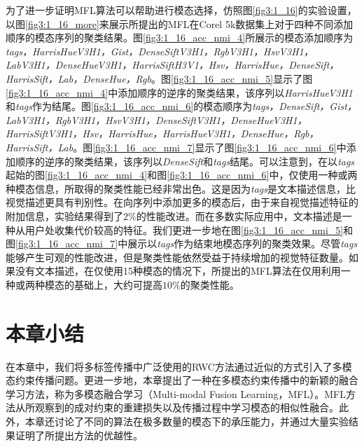 为了进一步证明MFL算法可以帮助进行模态选择，仿照图\ref{fig3:1_16}的实验设置，以图\ref{fig3:1_16_more}来展示所提出的MFL在Corel 5k数据集上对于四种不同添加顺序的模态序列的聚类结果。图\ref{fig3:1_16_acc_nmi_4}所展示的模态添加顺序为\textit{tags，HarrisHueV3H1，Gist，DenseSiftV3H1，RgbV3H1，HsvV3H1，LabV3H1，DenseHueV3H1，HarrisSiftH3V1，Hsv，HarrisHue，DenseSift，HarrisSift，Lab，DenseHue，Rgb}。图\ref{fig3:1_16_acc_nmi_5}显示了图\ref{fig3:1_16_acc_nmi_4}中添加顺序的逆序的聚类结果，该序列以\textit{HarrisHueV3H1}和\textit{tags}作为结尾。图\ref{fig3:1_16_acc_nmi_6}的模态顺序为\textit{tags，DenseSift，Gist，LabV3H1，RgbV3H1，HsvV3H1，DenseSiftV3H1，DenseHueV3H1，HarrisSiftV3H1，Hsv，HarrisHue，HarrisHueV3H1，DenseHue，Rgb，HarrisSift，Lab}。图\ref{fig3:1_16_acc_nmi_7}显示了图\ref{fig3:1_16_acc_nmi_6}中添加顺序的逆序的聚类结果，该序列以\textit{DenseSift}和\textit{tags}结尾。可以注意到，在以\textit{tags}起始的图\ref{fig3:1_16_acc_nmi_4}和图\ref{fig3:1_16_acc_nmi_6}中，仅使用一种或两种模态信息，所取得的聚类性能已经非常出色。这是因为\textit{tags}是文本描述信息，比视觉描述更具有判别性。在向序列中添加更多的模态后，由于来自视觉描述特征的附加信息，实验结果得到了$2\%$的性能改进。而在多数实际应用中，文本描述是一种从用户处收集代价较高的特征。我们更进一步地在图\ref{fig3:1_16_acc_nmi_5}和图\ref{fig3:1_16_acc_nmi_7}中展示以\textit{tags}作为结束地模态序列的聚类效果。尽管\textit{tags}能够产生可观的性能改进，但是聚类性能依然受益于持续增加的视觉特征数量。如果没有文本描述，在仅使用15种模态的情况下，所提出的MFL算法在仅用利用一种或两种模态的基础上，大约可提高$10\%$的聚类性能。

\section{本章小结}
在本章中，我们将多标签传播中广泛使用的RWC方法通过近似的方式引入了多模态约束传播问题。更进一步地，本章提出了一种在多模态约束传播中的新颖的融合学习方法，称为多模态融合学习（Multi-modal Fusion Learning，MFL）。MFL方法从所观察到的成对约束的重建损失以及传播过程中学习模态的相似性融合。此外，本章还讨论了不同的算法在极多数量的模态下的承压能力，并通过大量实验结果证明了所提出方法的优越性。